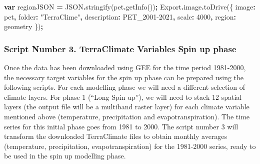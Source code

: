 \documentclass[
  10pt,
  b5paper,
]{book}
\newenvironment{Shaded}{\begin{snugshade}}{\end{snugshade}}
\newcommand{\AttributeTok}[1]{\textcolor[rgb]{0.77,0.63,0.00}{#1}}
\newcommand{\BuiltInTok}[1]{#1}
\newcommand{\DataTypeTok}[1]{\textcolor[rgb]{0.13,0.29,0.53}{#1}}
\newcommand{\DecValTok}[1]{\textcolor[rgb]{0.00,0.00,0.81}{#1}}
\newcommand{\FunctionTok}[1]{\textcolor[rgb]{0.00,0.00,0.00}{#1}}
\newcommand{\KeywordTok}[1]{\textcolor[rgb]{0.13,0.29,0.53}{\textbf{#1}}}
\newcommand{\NormalTok}[1]{#1}
\newcommand{\OperatorTok}[1]{\textcolor[rgb]{0.81,0.36,0.00}{\textbf{#1}}}
\newcommand{\StringTok}[1]{\textcolor[rgb]{0.31,0.60,0.02}{#1}}
\begin{document}
\begin{Shaded}
\begin{Highlighting}[]
\KeywordTok{var}\NormalTok{ regionJSON }\OperatorTok{=} \BuiltInTok{JSON}\OperatorTok{.}\FunctionTok{stringify}\NormalTok{(pet}\OperatorTok{.}\FunctionTok{getInfo}\NormalTok{())}\OperatorTok{;}
\NormalTok{Export}\OperatorTok{.}\AttributeTok{image}\OperatorTok{.}\FunctionTok{toDrive}\NormalTok{(\{}
          \DataTypeTok{image}\OperatorTok{:}\NormalTok{ pet}\OperatorTok{,}
          \DataTypeTok{folder}\OperatorTok{:} \StringTok{"TerraClime"}\OperatorTok{,}
          \DataTypeTok{description}\OperatorTok{:} \StringTok{\textquotesingle{}PET\_2001{-}2021\textquotesingle{}}\OperatorTok{,} 
          \DataTypeTok{scale}\OperatorTok{:} \DecValTok{4000}\OperatorTok{,}
          \DataTypeTok{region}\OperatorTok{:}\NormalTok{ geometry}
\NormalTok{\})}\OperatorTok{;}
\end{Highlighting}
\end{Shaded}

\hypertarget{script-number-3.-terraclimate-variables-spin-up-phase}{%
\subsubsection{Script Number 3. TerraClimate Variables Spin up phase}\label{script-number-3.-terraclimate-variables-spin-up-phase}}

Once the data has been downloaded using GEE for the time period 1981-2000, the necessary target variables for the spin up phase can be prepared using the following scripts. For each modelling phase we will need a different selection of climate layers. For phase 1 (``Long Spin up''), we will need to stack 12 spatial layers (the output file will be a multiband raster layer) for each climate variable mentioned above (temperature, precipitation and evapotranspiration). The time series for this initial phase goes from 1981 to 2000. The script number 3 will transform the downloaded TerraClimate files to obtain monthly averages (temperature, precipitation, evapotranspiration) for the 1981-2000 series, ready to be used in the spin up modelling phase.
\end{document}

